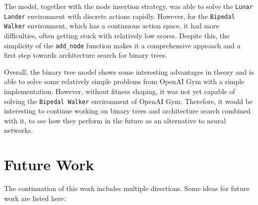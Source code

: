 The model, together with the node insertion strategy, was able to solve the \texttt{Lunar Lander} environment with discrete actions rapidly. However, for the \texttt{Bipedal Walker} environment, which has a continuous action space, it had more difficulties, often getting stuck with relatively low scores. Despite this, the simplicity of the \texttt{add\_node} function makes it a comprehensive approach and a first step towards architecture search for binary trees.

Overall, the binary tree model shows some interesting advantages in theory and is able to solve some relatively simple problems from OpenAI Gym with a simple implementation. However, without fitness shaping, it was not yet capable of solving the \texttt{Bipedal Walker} environment of OpenAI Gym. Therefore, it would be interesting to continue working on binary trees and architecture search combined with it, to see how they perform in the future as an alternative to neural networks.



\section{Future Work}

The continuation of this work includes multiple directions. Some ideas for future work are listed here:

